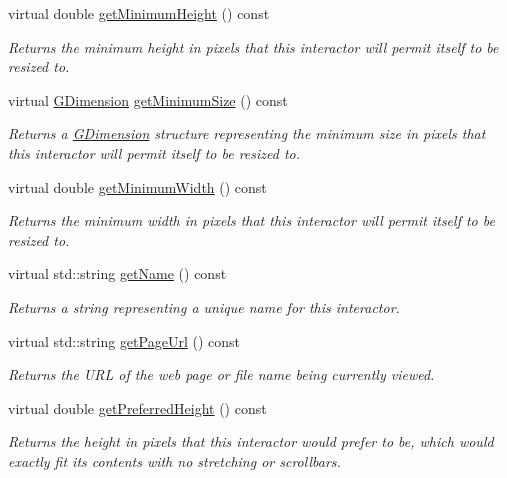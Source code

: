 \begin{DoxyCompactItemize}
virtual double \mbox{\hyperlink{classGInteractor_aed4b0075fcc434499c3cb3e46896bda3}{get\+Minimum\+Height}} () const
\begin{DoxyCompactList}\small\item\em Returns the minimum height in pixels that this interactor will permit itself to be resized to. \end{DoxyCompactList}\item 
virtual \mbox{\hyperlink{structGDimension}{G\+Dimension}} \mbox{\hyperlink{classGInteractor_a66b5af0b32493b4d597ca0a3df2049ea}{get\+Minimum\+Size}} () const
\begin{DoxyCompactList}\small\item\em Returns a \mbox{\hyperlink{structGDimension}{G\+Dimension}} structure representing the minimum size in pixels that this interactor will permit itself to be resized to. \end{DoxyCompactList}\item 
virtual double \mbox{\hyperlink{classGInteractor_a59e668114fe3d49d2a0f28deb258f7c8}{get\+Minimum\+Width}} () const
\begin{DoxyCompactList}\small\item\em Returns the minimum width in pixels that this interactor will permit itself to be resized to. \end{DoxyCompactList}\item 
virtual std\+::string \mbox{\hyperlink{classGInteractor_a8a60438a5b55d0b2ceb35c8674b9d8c5}{get\+Name}} () const
\begin{DoxyCompactList}\small\item\em Returns a string representing a unique name for this interactor. \end{DoxyCompactList}\item 
virtual std\+::string \mbox{\hyperlink{classGBrowserPane_aa7607fcbc7eef6590fae7a2d513268de}{get\+Page\+Url}} () const
\begin{DoxyCompactList}\small\item\em Returns the U\+RL of the web page or file name being currently viewed. \end{DoxyCompactList}\item 
virtual double \mbox{\hyperlink{classGInteractor_a747de0961653847bdc6615dbf756d715}{get\+Preferred\+Height}} () const
\begin{DoxyCompactList}\small\item\em Returns the height in pixels that this interactor would prefer to be, which would exactly fit its contents with no stretching or scrollbars. \end{DoxyCompactList}\item 

\end{DoxyCompactItemize}
